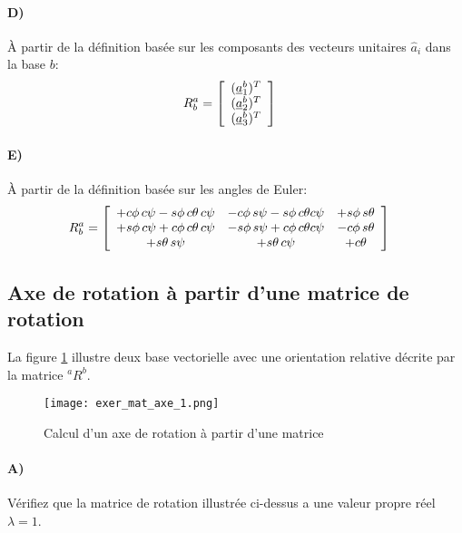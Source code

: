 \paragraph{D)} À partir de la définition basée sur les composants des vecteurs unitaires $\hat{a}_i$ dans la base $b$:
\begin{align}
R_b^a &= 
\left[ \begin{array}{c} 
(\underline{a}_1^b)^T \\
(\underline{a}_2^b)^T \\
(\underline{a}_3^b)^T
\end{array} \right] 
\end{align} 
\paragraph{E)} À partir de la définition basée sur les angles de Euler:
\begin{align}
R_b^a &= 
\left[ \begin{array}{c c c}
	 + c\phi \, c\psi - s\phi\,c\theta\,c\psi  & - c\phi \, s\psi - s\phi \, c\theta c\psi  & + s\phi \, s\theta  \\
	 + s\phi \, c\psi + c\phi\,c\theta\,c\psi  & - s\phi \, s\psi + c\phi \, c\theta c\psi  & - c\phi \, s\theta  \\
	 + s\theta \, s\psi                        & + s\theta \, c\psi                          & + c\theta 
\end{array}  \right]
\end{align} 



\subsection{Axe de rotation à partir d'une matrice de rotation}

La figure \ref{fig:exer_mat_axe_1} illustre deux base vectorielle avec une orientation relative décrite par la matrice ${}^aR^b$. 
\begin{figure}[H]
	\centering
		\texttt{[image: exer\_mat\_axe\_1.png]}
	\caption{Calcul d'un axe de rotation à partir d'une matrice}
	\label{fig:exer_mat_axe_1}
\end{figure}

\paragraph{A)} Vérifiez que la matrice de rotation illustrée ci-dessus a une valeur propre réel $\lambda=1$.

